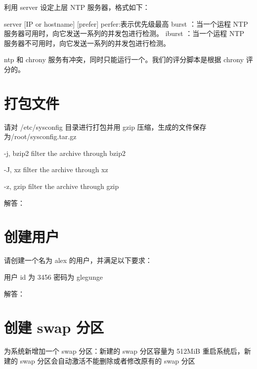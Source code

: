 \documentclass[letterpaper,10pt,english]{sphinxmanual}
\begin{document}
利用 server 设定上层 NTP 服务器，格式如下：

server {[}IP or hostname{]} {[}prefer{]} perfer:表示优先级最高 burst ：当一个运程 NTP 服务器可用时，向它发送一系列的并发包进行检测。 iburst ：当一个运程 NTP 服务器不可用时，向它发送一系列的并发包进行检测。

ntp 和 chrony 服务有冲突，同时只能运行一个。我们的评分脚本是根据 chrony 评分的。


\section{打包文件}
\label{\detokenize{rhcsa/rhcsa_7:id9}}
请对 /etc/sysconfig 目录进行打包并用 gzip 压缩，生成的文件保存为/root/sysconfig.tar.gz

-j, \textendash{}bzip2 filter the archive through bzip2

-J, \textendash{}xz filter the archive through xz

-z, \textendash{}gzip filter the archive through gzip

解答：

%
\begin{sphinxVerbatim}[commandchars=\\\{\}]
\PYG{p}{[} \PYG{p}{]}
\end{sphinxVerbatim}


\section{创建用户}
\label{\detokenize{rhcsa/rhcsa_7:id10}}
请创建一个名为 alex 的用户，并满足以下要求：

用户 id 为 3456 密码为 glegunge

解答：

%
\begin{sphinxVerbatim}[commandchars=\\\{\}]
\PYG{p}{[} \PYG{p}{]}
\PYG{p}{[} \PYG{p}{]}
\end{sphinxVerbatim}


\section{创建 swap 分区}
\label{\detokenize{rhcsa/rhcsa_7:swap}}
为系统新增加一个 swap 分区：新建的 swap 分区容量为 512MiB 重启系统后，新建的 swap 分区会自动激活不能删除或者修改原有的 swap 分区
\end{document}
